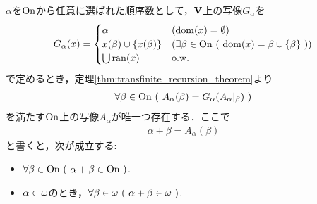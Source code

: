 	\begin{screen}
		\begin{thm}[順序数の加法]\label{thm:the_definition_of_addition_of_ordinal_numbers}
			$\alpha$を$\mathrm{On}$から任意に選ばれた順序数として，$\mathbf{V}$上の写像$G_\alpha$を
			\begin{align}
				G_\alpha(x) = 
				\begin{cases}
					\alpha & (\operatorname{dom}(x) = \emptyset) \\
					x(\beta) \cup \{x(\beta)\} & (
					\exists \beta \in \mathrm{On}\ (\ \operatorname{dom}(x) = \beta \cup \{\beta\}\ )) \\
					\bigcup \operatorname{ran}(x) & \mathrm{o.w.}
				\end{cases}
			\end{align}
			で定めるとき，定理\ref{thm:transfinite_recursion_theorem}より
			\begin{align}
				\forall \beta \in \mathrm{On}\ (\ A_\alpha(\beta) = G_\alpha(A_\alpha|_\beta)\ )
			\end{align}
			を満たす$\mathrm{On}$上の写像$A_\alpha$が唯一つ存在する．ここで
			\begin{align}
				\alpha + \beta = A_\alpha (\beta)
			\end{align}
			と書くと，次が成立する:
			\begin{itemize}
				\item $\forall \beta \in \mathrm{On}\ (\ \alpha + \beta \in \mathrm{On}\ )$.
				\item $\alpha \in {\bf \omega}$のとき，$\forall \beta \in {\bf \omega}\ 
				(\ \alpha + \beta \in {\bf \omega}\ )$.
			\end{itemize}
		\end{thm}
	\end{screen}
	
